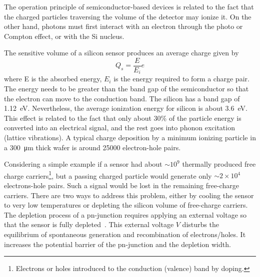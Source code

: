 The operation principle of semiconductor-based devices is related to the fact that the charged particles traversing the volume of the detector may ionize it. %
On the other hand, photons must first interact with an electron through the photo or Compton effect, or with the Si nucleus. 

The sensitive volume of a silicon sensor produces an average charge given by 
\begin{equation}
    Q_{s} = \frac{E}{E_{i}}e
\end{equation}
where E is the absorbed energy, $E_{i}$ is the energy required to form a charge pair. The energy needs to be greater than the band gap of the semiconductor so that the electron can move to the conduction band. The silicon has a band gap of \SI{1.12}{\eV}. Nevertheless, the average ionization energy for silicon is about \SI{3.6}{\eV}. This effect is related to the fact that only about 30\% of the particle energy is converted into an electrical signal, and the rest goes into phonon excitation (lattice vibrations). A typical charge deposition by a minimum ionizing particle in a \SI{300}{\micro\metre} thick wafer is around 25000 electron-hole pairs.

Considering a simple example if a sensor had about $\sim10^{9}$ thermally produced free charge carriers\footnote{Electrons or holes introduced to the conduction (valence) band by doping.}, but a passing charged particle would generate only $\sim2\times10^{4}$ electrons-hole pairs. Such a signal would be lost in the remaining free-charge carriers. There are two ways to address this problem, either by cooling the sensor to very low temperatures or depleting the silicon volume of free-charge carriers. The depletion process of a pn-junction requires applying an external voltage so that the sensor is fully depleted~\cite{Spieler}. This external voltage $V$ disturbs the equilibrium of spontaneous generation and recombination of electrons/holes. It increases the potential barrier of the pn-junction and the depletion width. 

